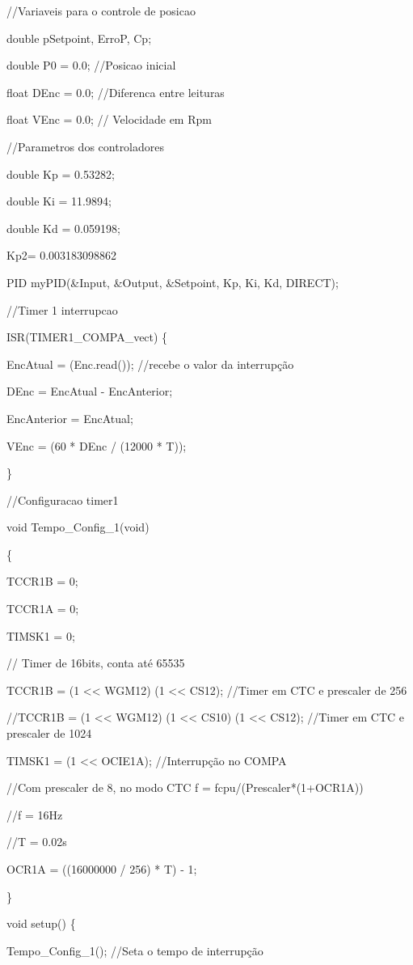 \documentclass[]{article}
\begin{document}
//Variaveis para o controle de posicao

double pSetpoint, ErroP, Cp;

double P0 = 0.0; //Posicao inicial

float DEnc = 0.0; //Diferenca entre leituras

float VEnc = 0.0; // Velocidade em Rpm

//Parametros dos controladores

double Kp = 0.53282;

double Ki = 11.9894;

double Kd = 0.059198;

Kp2= 0.003183098862

PID myPID(\&Input, \&Output, \&Setpoint, Kp, Ki, Kd, DIRECT);

//Timer 1 interrupcao

ISR(TIMER1\_COMPA\_vect) \{

EncAtual = (Enc.read()); //recebe o valor da interrupção

DEnc = EncAtual - EncAnterior;

EncAnterior = EncAtual;

VEnc = (60 * DEnc / (12000 * T));

\}

//Configuracao timer1

void Tempo\_Config\_1(void)

\{

TCCR1B = 0;

TCCR1A = 0;

TIMSK1 = 0;

// Timer de 16bits, conta até 65535

TCCR1B \textbar{}= (1 \textless{}\textless{} WGM12) \textbar{} (1
\textless{}\textless{} CS12); //Timer em CTC e prescaler de 256

//TCCR1B \textbar{}= (1 \textless{}\textless{} WGM12) \textbar{} (1
\textless{}\textless{} CS10)\textbar{} (1 \textless{}\textless{} CS12);
//Timer em CTC e prescaler de 1024

TIMSK1 = (1 \textless{}\textless{} OCIE1A); //Interrupção no COMPA

//Com prescaler de 8, no modo CTC f = fcpu/(Prescaler*(1+OCR1A))

//f = 16Hz

//T = 0.02s

OCR1A = ((16000000 / 256) * T) - 1;

\}

void setup() \{

Tempo\_Config\_1(); //Seta o tempo de interrupção
\end{document}
